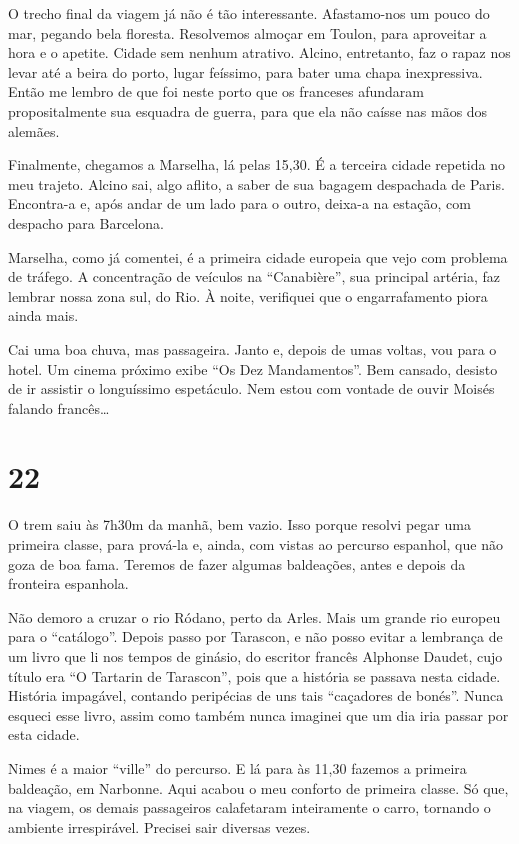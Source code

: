 O trecho final da viagem já não é tão interessante. Afastamo-nos um pouco do mar, pegando bela floresta. Resolvemos almoçar em Toulon, para aproveitar a hora e o apetite. Cidade sem nenhum atrativo. Alcino, entretanto, faz o rapaz nos levar até a beira do porto, lugar feíssimo, para bater uma chapa inexpressiva. Então me lembro de que foi neste porto que os franceses afundaram propositalmente sua esquadra de guerra, para que ela não caísse nas mãos dos alemães.

Finalmente, chegamos a Marselha, lá pelas 15,30. É a terceira cidade repetida no meu trajeto. Alcino sai, algo aflito, a saber de sua bagagem despachada de Paris. Encontra-a e, após andar de um lado para o outro, deixa-a na estação, com despacho para Barcelona.

Marselha, como já comentei, é a primeira cidade europeia que vejo com problema de tráfego. A concentração de veículos na “Canabière”, sua principal artéria, faz lembrar nossa zona sul, do Rio. À noite, verifiquei que o engarrafamento piora ainda mais.

Cai uma boa chuva, mas passageira. Janto e, depois de umas voltas, vou para o hotel. Um cinema próximo exibe “Os Dez Mandamentos”. Bem cansado, desisto de ir assistir o longuíssimo espetáculo. Nem estou com vontade de ouvir Moisés falando francês\ldots

\section*{22 \adfflatleafright {}}
O trem saiu às 7h30m da manhã, bem vazio. Isso porque resolvi pegar uma primeira classe, para prová-la e, ainda, com vistas ao percurso espanhol, que não goza de boa fama. Teremos de fazer algumas baldeações, antes e depois da fronteira espanhola.

Não demoro a cruzar o rio Ródano, perto da Arles. Mais um grande rio europeu para o “catálogo”. Depois passo por Tarascon, e não posso evitar a lembrança de um livro que li nos tempos de ginásio, do escritor francês Alphonse Daudet, cujo título era “O Tartarin de Tarascon”, pois que a história se passava nesta cidade. História impagável, contando peripécias de uns tais “caçadores de bonés”. Nunca esqueci esse livro, assim como também nunca imaginei que um dia iria passar por esta cidade.

Nimes é a maior “ville” do percurso. E lá para às 11,30 fazemos a primeira baldeação, em Narbonne. Aqui acabou o meu conforto de primeira classe. Só que, na viagem, os demais passageiros calafetaram inteiramente o carro, tornando o ambiente irrespirável. Precisei sair diversas vezes.

